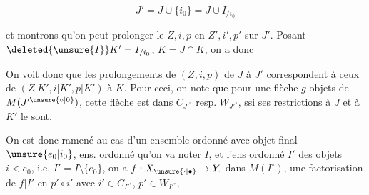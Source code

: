 
\[
 J'=J\cup\{i_0\}=J\cup I_{/i_0}
\]

et montrons qu'on peut prolonger le   $Z,i,p$ en $Z',i',p'$ sur $J'$. Posant $\deleted{\unsure{I}}K'=I_{/i_0}$, $K=J\cap K$, on a donc


On voit donc que les prolongements de $(Z,i,p)$ de $J$ à $J'$ correspondent à ceux de $(Z|K',i|K',p|K')$ à $K$. Pour ceci, on note que pour une flèche $g$  objets de $M(J'^{\unsure{\circ|0}})$, cette flèche est dans $C_{J'^\circ}$ resp. $W_{J'^\circ}$, ssi ses restrictions à $J$ et à $K'$ le sont.

On est donc ramené au cas  d'un ensemble ordonné  avec objet final $\unsure{e_0|i_0}$, ens. ordonné qu'on va noter $I$, et l'ens ordonné $I'$ des objets $i<e_0$, i.e. $I'=I\setminus\{e_0\}$, on a $f:X_{\unsure{\cdot|\bullet}}\to Y_{\cdot}$  dans $M(I^\circ)$, une factorisation de $f|I'$ en $p'\circ i'$ avec $i'\in C_{I'^\circ}$, $p'\in W_{I'^\circ}$,
